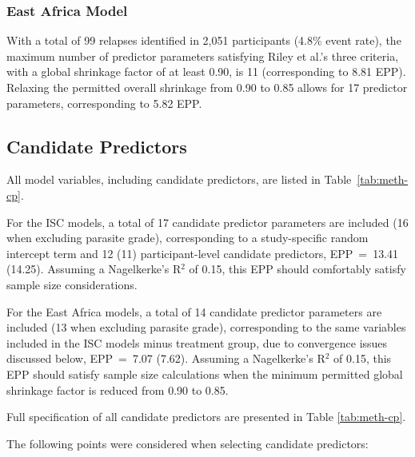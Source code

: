 \subsubsection{East Africa Model}

With a total of 99 relapses identified in 2,051 participants (4.8\% event rate), the maximum number of predictor parameters satisfying Riley et al.'s three criteria, with a global shrinkage factor of at least 0.90, is 11 (corresponding to 8.81 EPP). Relaxing the permitted overall shrinkage from 0.90 to 0.85 allows for 17 predictor parameters, corresponding to 5.82 EPP.

\subsection{\label{sec:meth-candidate-pred}Candidate Predictors}

All model variables, including candidate predictors, are listed in Table~\ref{tab:meth-cp}.

For the ISC models, a total of 17 candidate predictor parameters are included (16 when excluding parasite grade), corresponding to a study-specific random intercept term and 12 (11) participant-level candidate predictors, EPP~=~13.41 (14.25). Assuming a Nagelkerke's R$^2$ of 0.15, this EPP should comfortably satisfy sample size considerations.

For the East Africa models, a total of 14 candidate predictor parameters are included (13 when excluding parasite grade), corresponding to the same variables included in the ISC models minus treatment group, due to convergence issues discussed below, EPP~=~7.07 (7.62). Assuming a Nagelkerke's R$^2$ of 0.15, this EPP should satisfy sample size calculations when the minimum permitted global shrinkage factor is reduced from 0.90 to 0.85.

Full specification of all candidate predictors are presented in Table \ref{tab:meth-cp}.



The following points were considered when selecting candidate predictors:

